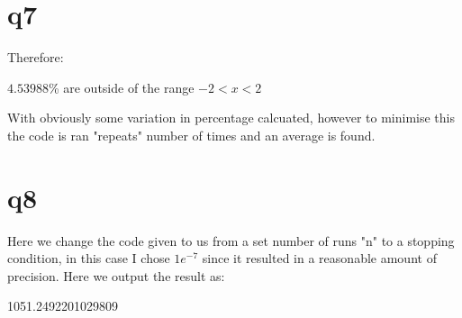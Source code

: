 \documentclass[a4paper,english]{article}
\begin{document}
    \section{q7}
    
    Therefore:
    \begin{center}
        $4.53988$\% are outside of the range $-2 < x < 2$
    \end{center}
    With obviously some variation in percentage calcuated, however to minimise this the code is ran "repeats" number of times and an average is found.
    \section{q8}
    
    Here we change the code given to us from a set number of runs "n" to a stopping condition, in this case I chose $1e^{-7}$ since it resulted in a reasonable amount of precision.
    Here we output the result as:
    \begin{center}
        1051.2492201029809
    \end{center}
\end{document}
